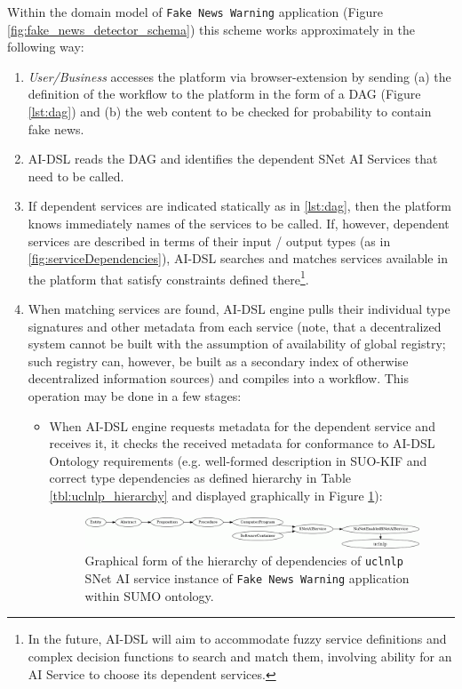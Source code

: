 \documentclass[]{report}
\begin{document}
Within the domain model of \texttt{Fake News Warning} application (Figure 
\ref{fig:fake_news_detector_schema}) this scheme works approximately in the following
way:
\begin{enumerate}
\item \textit{User/Business} accesses the platform 
via browser-extension by sending (a) the definition of the workflow to the
platform in the form of a DAG (Figure \ref{lst:dag}) and 
(b) the web content to be checked for probability to contain fake news.
\item AI-DSL reads the DAG and identifies the dependent SNet AI Services that
need to be called. 
\item If dependent services are indicated statically as in \ref{lst:dag},
then the platform knows immediately names of the services to be called. If, however, 
dependent services are described in terms of their input / output types (as in 
\ref{fig:serviceDependencies}), AI-DSL searches and matches services available
in the platform that satisfy constraints defined there\footnote{In the future, AI-DSL 
will aim to accommodate fuzzy service definitions and complex decision functions to 
search and match them, involving ability for an AI Service to choose its 
dependent services.}. 
\item When matching services are found, AI-DSL engine pulls their individual type
signatures and other metadata from each service (note, that a decentralized system 
cannot be built with the assumption of availability of global registry; such registry 
can, however, be built as a secondary index of otherwise decentralized information 
sources) and compiles into a workflow. This operation may be done in a few stages:
\begin{itemize}
	\item When AI-DSL engine requests metadata for the dependent service and receives it, 
	it checks the received metadata for conformance to AI-DSL Ontology requirements
	(e.g. well-formed description in SUO-KIF and correct type dependencies as defined
	hierarchy in Table \ref{tbl:uclnlp_hierarchy} and displayed graphically in 
	Figure \ref{fig:uclnlp_hierarchy_graph}):
	
\begin{figure}[H]
	\centering
	\includegraphics[width=1\textwidth]{../../../ontology/images/uclnp_hierarchy_graph.png}
	\captionsetup{width=0.9\linewidth}
	\caption{\label{fig:uclnlp_hierarchy_graph}Graphical form of the hierarchy of 
	dependencies of \texttt{uclnlp} SNet AI service instance of \texttt{Fake News Warning} 
	application within SUMO ontology.}
\end{figure}


\end{itemize}
\end{enumerate}
\end{document}

